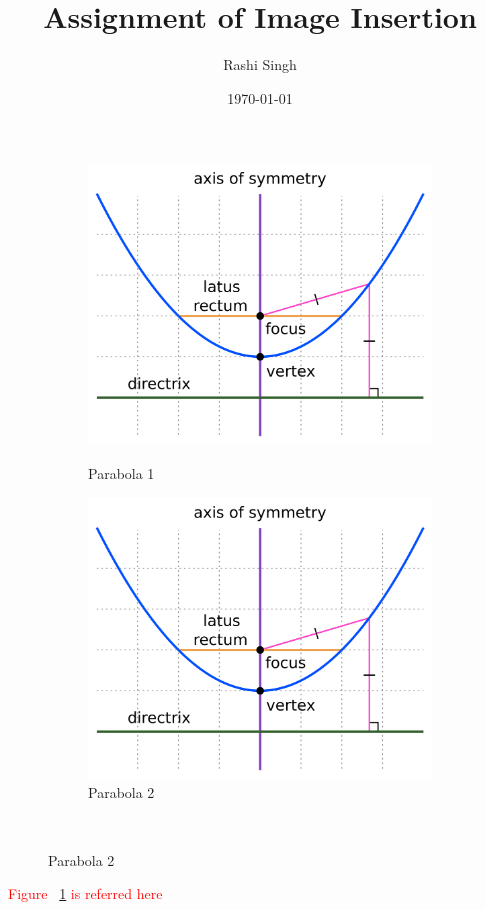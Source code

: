 \documentclass[10pt,twocolumn]{article}
\begin{document}
	\title{Assignment of Image Insertion}
	\author{Rashi Singh}
	\date{\today}
	\maketitle
	\blindtext
	\begin{figure}[h]
		\begin{subfigure}[c]{0.45\textwidth}
			\includegraphics[width=.75\textwidth,right]{parabola}
			\centering
			\label{1a}
			\begin{flushright}\caption{Parabola 1}\end{flushright}
		\end{subfigure}
		\hfill
		\begin{subfigure}[c]{0.45\textwidth}
			\includegraphics[width=.75\textwidth,left]{parabola}
			\centering
			\begin{center}\caption{Parabola 2}\end{center}
		\end{subfigure}\\
	\end{figure}
	\blindtext
	\lipsum
	\textcolor{red}{Figure ~\ref{1a} is referred here}
\end{document}
